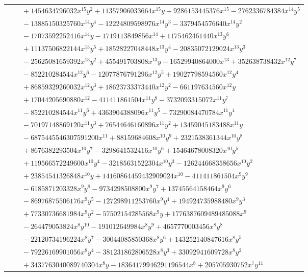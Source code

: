 \documentclass[11pt]{article}
\begin{document}
\begin{longtable}{@{}ll@{}}
 & $\quad +1454634796032x^{15}y^{2}+11357906033664x^{15}y+9286153445376x^{15}-2762336784384x^{14}y^{5}$\\
 & $\quad -13885150325760x^{14}y^{4}-12224809598976x^{14}y^{3}-3379454576640x^{14}y^{2}$\\
 & $\quad -17073592252416x^{14}y-1719113849856x^{14}+1175462461440x^{13}y^{6}$\\
 & $\quad +11137506822144x^{13}y^{5}+18528227048448x^{13}y^{4}-20835072129024x^{13}y^{3}$\\
 & $\quad -25625081659392x^{13}y^{2}+455491703808x^{13}y-16529940864000x^{13}+352638738432x^{12}y^{7}$\\
 & $\quad -852210284544x^{12}y^{6}-12077876791296x^{12}y^{5}+19027798594560x^{12}y^{4}$\\
 & $\quad +86859329260032x^{12}y^{3}+18623733373440x^{12}y^{2}-661197634560x^{12}y$\\
 & $\quad +17044205690880x^{12}-411411861504x^{11}y^{8}-3732093315072x^{11}y^{7}$\\
 & $\quad -852210284544x^{11}y^{6}+4363904388096x^{11}y^{5}-73290084470784x^{11}y^{4}$\\
 & $\quad -70197148869120x^{11}y^{3}+76544646160896x^{11}y^{2}+13459045183488x^{11}y$\\
 & $\quad -6875445546307591200x^{11}+88159684608x^{10}y^{9}+2321538361344x^{10}y^{8}$\\
 & $\quad +8676382293504x^{10}y^{7}-3298641532416x^{10}y^{6}+15464678008320x^{10}y^{5}$\\
 & $\quad +119566572249600x^{10}y^{4}-32185631522304x^{10}y^{3}-126244668358656x^{10}y^{2}$\\
 & $\quad +23854541326848x^{10}y+14160864459432909024x^{10}-411411861504x^{9}y^{9}$\\
 & $\quad -6185871203328x^{9}y^{8}-9734298508800x^{9}y^{7}+13745564158464x^{9}y^{6}$\\
 & $\quad -86976875506176x^{9}y^{5}-127298911253760x^{9}y^{4}+194924735988480x^{9}y^{3}$\\
 & $\quad +77330736681984x^{9}y^{2}-57502154285568x^{9}y+1776387609489485088x^{9}$\\
 & $\quad -264479053824x^{8}y^{10}-191012649984x^{8}y^{9}+4657770003456x^{8}y^{8}$\\
 & $\quad -22120734196224x^{8}y^{7}-30044085850368x^{8}y^{6}+143252140847616x^{8}y^{5}$\\
 & $\quad -79226169901056x^{8}y^{4}-381231862806528x^{8}y^{3}+33092941609728x^{8}y^{2}$\\
 & $\quad +3437763040089740304x^{8}y-18364179946291196544x^{8}+205705930752x^{7}y^{11}$\\

\end{longtable}
\end{document}
